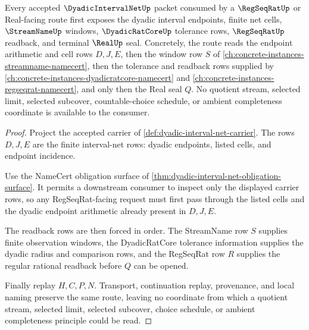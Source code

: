 \begin{theorem}\label{thm:dyadic-interval-net-regseqrat-route}
Every accepted $\DyadicIntervalNetUp$ packet consumed by a $\RegSeqRatUp$ or Real-facing route first exposes the dyadic interval endpoints, finite net cells, $\StreamNameUp$ windows, $\DyadicRatCoreUp$ tolerance rows, $\RegSeqRatUp$ readback, and terminal $\RealUp$ seal. Concretely, the route reads the endpoint arithmetic and cell rows $D,J,E$, then the window row $S$ of \autoref{ch:concrete-instances-streamname-namecert}, then the tolerance and readback rows supplied by \autoref{ch:concrete-instances-dyadicratcore-namecert} and \autoref{ch:concrete-instances-regseqrat-namecert}, and only then the Real seal $Q$. No quotient stream, selected limit, selected subcover, countable-choice schedule, or ambient completeness coordinate is available to the consumer.
\end{theorem}
\begin{proof}
Project the accepted carrier of \autoref{def:dyadic-interval-net-carrier}. The rows $D,J,E$ are the finite interval-net rows: dyadic endpoints, listed cells, and endpoint incidence.

Use the NameCert obligation surface of \autoref{thm:dyadic-interval-net-obligation-surface}. It permits a downstream consumer to inspect only the displayed carrier rows, so any RegSeqRat-facing request must first pass through the listed cells and the dyadic endpoint arithmetic already present in $D,J,E$.

The readback rows are then forced in order. The StreamName row $S$ supplies finite observation windows, the DyadicRatCore tolerance information supplies the dyadic radius and comparison rows, and the RegSeqRat row $R$ supplies the regular rational readback before $Q$ can be opened.

Finally replay $H,C,P,N$. Transport, continuation replay, provenance, and local naming preserve the same route, leaving no coordinate from which a quotient stream, selected limit, selected subcover, choice schedule, or ambient completeness principle could be read.
\end{proof}

